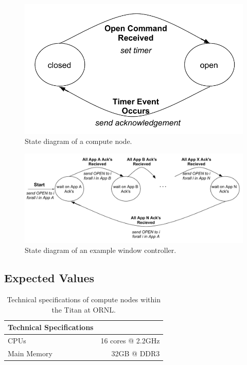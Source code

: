 \documentclass[oneside,12pt]{memoir}
\begin{document}
\begin{figure}
\centering
\includegraphics[scale=0.5]{node_state_diagram.pdf}
\caption{State diagram of a compute node.}
\label{fig:node_state_diagram}
\end{figure}

\begin{figure}
\centering
\includegraphics[scale=0.5]{control_state_diagram.pdf}
\caption{State diagram of an example window controller.}
\label{fig:control_state_diagram}
\end{figure}
\subsection{Expected Values}

\begin{table}
	\begin{center}
	    \begin{tabular}{  l | r  }
	    Technical Specifications & \\ \hline
	    CPUs & 16 cores @ 2.2GHz \\
	    Main Memory & 32GB @ DDR3\\
	    \end{tabular}
	\end{center}
	\caption{Technical specifications of compute nodes within the Titan at ORNL.}
	\label{tab:titan_ORNL}
\end{table}
\end{document}

